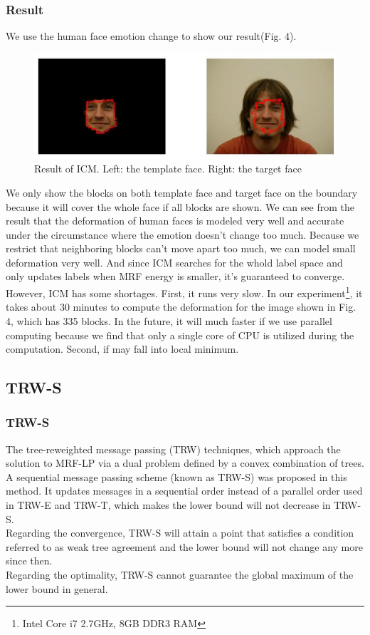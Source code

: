 \documentclass{article} %
\begin{document}
		\subsubsection{Result}
		We use the human face emotion change to show our result(Fig. 4).
		\begin{figure}[!ht]
		\centering
		\includegraphics[scale=0.4]{../Result/new-face3.jpg}
		\caption{Result of ICM. Left: the template face. Right: the target face}
		\end{figure}
		We only show the blocks on both template face and target face on the boundary because it will cover the whole face if all blocks are shown. We can see from the result that the deformation of human faces is modeled very well and accurate under the circumstance where the emotion doesn't change too much. Because we restrict that neighboring blocks can't move apart too much, we can model small deformation very well. And since ICM searches for the whold label space and only updates labels when MRF energy is smaller, it's guaranteed to converge.\\
		However, ICM has some shortages. First, it runs very slow. In our experiment\footnote{Intel Core i7 2.7GHz, 8GB DDR3 RAM}, it takes about 30 minutes to compute the deformation for the image shown in Fig. 4, which has 335 blocks. In the future, it will much faster if we use parallel computing because we find that only a single core of CPU is utilized during the computation. Second, if may fall into local minimum.

	\subsection{TRW-S}
		\subsubsection{TRW-S\cite{Chaohui2013}}
        The tree-reweighted message passing (TRW) techniques\cite{kolmogorov2006convergent}, which approach the solution to MRF-LP via a dual problem defined by a convex combination of trees.\\
        A sequential message passing scheme (known as TRW-S) was proposed in this method. It updates messages in a sequential order instead of a parallel order used in TRW-E and TRW-T, which makes the lower bound will not decrease in TRW-S.\\
        Regarding the convergence, TRW-S will attain a point that satisfies a condition referred to as weak tree agreement and the lower bound will not change any more since then.\\
        Regarding the optimality, TRW-S cannot guarantee the global maximum of the lower bound in general.
\end{document}
